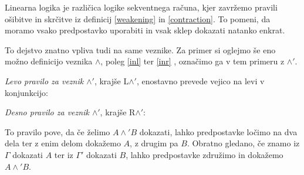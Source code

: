 Linearna logika je različica logike sekventnega računa, kjer zavržemo pravili ošibitve in skrčitve iz definicij \ref{weakening} in \ref{contraction}. To pomeni, da moramo vsako predpostavko uporabiti in vsak sklep dokazati natanko enkrat.

To dejstvo znatno vpliva tudi na same veznike. Za primer si oglejmo še eno možno definicijo veznika $\land$, poleg \ref{inl} ter \ref{inr} , označimo ga v tem primeru z $\land'$.
\begin{definicija} \label{in'l}
    \emph{Levo pravilo za veznik $\land'$}, krajše L$\land'$, enostavno prevede vejico na levi v konjunkcijo:
    \begin{prooftree}
    \end{prooftree}
\end{definicija}

\begin{definicija} \label{in'r}
	\emph{Desno pravilo za veznik $\land'$}, krajše R$\land'$:
    \begin{prooftree}
    \end{prooftree}
    To pravilo pove, da če želimo $A \land' B$ dokazati, lahko predpostavke ločimo na dva dela ter z enim delom dokažemo $A$, z drugim pa $B$. Obratno gledano, če znamo iz $\Gamma$ dokazati $A$ ter iz $\Gamma'$ dokazati $B$, lahko predpostavke združimo in dokažemo $A \land' B$.
\end{definicija}

